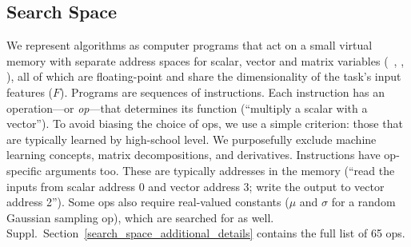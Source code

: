 \subsection{Search Space}
\label{methods_search_space_sec}

We represent algorithms as computer programs that act on a small virtual memory with separate address spaces for scalar, vector and matrix variables (\eg\ , , ), all of which are floating-point and share the dimensionality of the task's input features ($F$). Programs are sequences of instructions. Each instruction has an operation---or \textit{op}---that determines its function (\eg ``multiply a scalar with a vector''). To avoid biasing the choice of ops, we use a simple criterion: those that are typically learned by high-school level. We purposefully exclude machine learning concepts, matrix decompositions, and derivatives. Instructions have op-specific arguments too. These are typically addresses in the memory (\eg ``read the inputs from scalar address 0 and vector address 3; write the output to vector address 2''). Some ops also require real-valued constants (\eg $\mu$ and $\sigma$ for a random Gaussian sampling op), which are searched for as well. Suppl.\  Section~\ref{search_space_additional_details} contains the full list of 65 ops.

